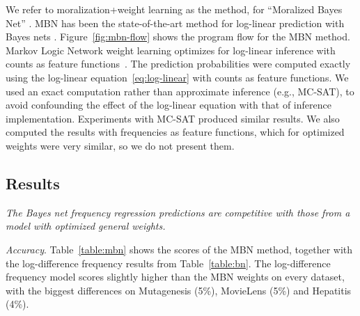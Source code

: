 \documentclass[runningheads,a4paper]{llncs}
\newcommand{\point}[1]{\noindent\emph{#1}.}
\newcommand{\keypoint}[1]{{\em #1}}
\begin{document}
We refer to moralization+weight learning as the  method, for ``Moralized Bayes Net''   \cite{Khosravi2010}. 
MBN has been the state-of-the-art method for log-linear prediction with Bayes nets \cite{Schulte2012}. Figure~\ref{fig:mbn-flow} shows the program flow for the MBN method.
Markov Logic Network weight learning optimizes for log-linear inference with counts as feature functions~\cite{Schulte2011}. The prediction probabilities were computed exactly using the log-linear equation~\ref{eq:log-linear} with counts as feature functions. We used an exact computation rather than approximate inference
(e.g., MC-SAT), to avoid confounding the effect of the log-linear equation with that of inference implementation. Experiments with MC-SAT produced similar results. We also computed the results with frequencies as feature functions, which for optimized weights were very similar, so we do not present them. 





\subsection{Results}

\keypoint{The Bayes net frequency regression predictions are competitive with those from a model with optimized general weights.}

\point{Accuracy} Table~\ref{table:mbn} shows the scores of the MBN method, together with the log-difference frequency results from Table~\ref{table:bn}. The log-difference frequency model scores slightly higher than the MBN weights on every dataset, with the biggest differences on Mutagenesis (5\%),  MovieLens (5\%) and Hepatitis (4\%). 
\end{document}
